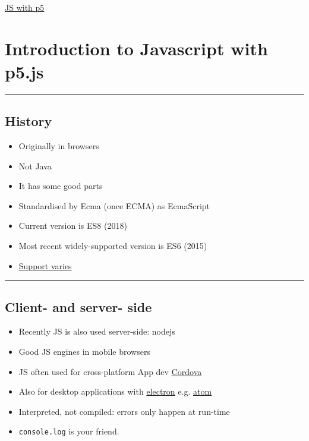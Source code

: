 \documentclass{article}[18pt]
\providecommand{\tightlist}{%
	\setlength{\itemsep}{0pt}\setlength{\parskip}{0pt}}
\begin{document}
\begin{center}
\underline{\huge JS with p5}
\end{center}


\hypertarget{introduction-to-javascript-with-p5.js}{%
	\section{Introduction to Javascript with
		p5.js}\label{introduction-to-javascript-with-p5.js}}

\begin{center}\rule{0.5\linewidth}{\linethickness}\end{center}

\subsection{History}

\begin{itemize}
	\tightlist
	\item
	Originally in browsers
	\item
	Not Java
	\item
	It has some good parts
	\item
	Standardised by Ecma (once ECMA) as EcmaScript
	\item
	Current version is ES8 (2018)
	\item
	Most recent widely-supported version is ES6 (2015)
	\item
	\href{http://kangax.github.io/compat-table/es6/}{Support varies}
\end{itemize}

\begin{center}\rule{0.5\linewidth}{\linethickness}\end{center}

\hypertarget{client--and-server--side}{%
	\subsection{Client- and server- side}\label{client--and-server--side}}

\begin{itemize}
	\tightlist
	\item
	Recently JS is also used server-side: nodejs
	\item
	Good JS engines in mobile browsers
	\item
	JS often used for cross-platform App dev
	\href{https://cordova.apache.org/}{Cordova}
	\item
	Also for desktop applications with
	\href{https://electronjs.org/}{electron} e.g.
	\href{https://atom.io/}{atom}
	\item
	Interpreted, not compiled: errors only happen at run-time
	\item
	\texttt{console.log} is your friend.
\end{itemize}
\end{document}
